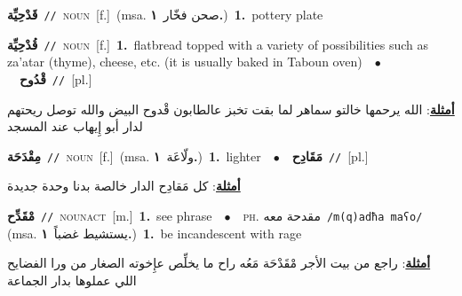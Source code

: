 \documentclass[10pt,a4paper,twoside]{article} %
\begin{document}
\begin{multicols}{2}
{\setlength\topsep{0pt}\textbf{\foreignlanguage{arabic}{قَدْحِيِّة}}\ {\color{gray}\texttt{//}\color{black}}\ \textsc{noun}\ [f.]\ \color{gray}(msa. \foreignlanguage{arabic}{صحن فخّار}~\foreignlanguage{arabic}{\textbf{١.}})\color{black}\ \textbf{1.}~pottery plate\ } \vspace{2mm}

{\setlength\topsep{0pt}\textbf{\foreignlanguage{arabic}{قُدْحِيِّة}}\ {\color{gray}\texttt{//}\color{black}}\ \textsc{noun}\ [f.]\ \textbf{1.}~flatbread topped with a variety of possibilities such as za'atar (thyme), cheese, etc. (it is usually baked in Taboun oven)\ \ $\bullet$\ \ \setlength\topsep{0pt}\textbf{\foreignlanguage{arabic}{قْدُوح}}\ {\color{gray}\texttt{//}\color{black}}\ [pl.]\  \begin{flushright}\color{gray}\foreignlanguage{arabic}{\textbf{\underline{\foreignlanguage{arabic}{أمثلة}}}: الله يرحمها خالتو سماهر لما بقت تخبز عالطابون قْدوح البيض والله توصل ريحتهم لدار أبو إِيهاب عند المسجد}\end{flushright}\color{black}} \vspace{2mm}

{\setlength\topsep{0pt}\textbf{\foreignlanguage{arabic}{مِقْدَحَة}}\ {\color{gray}\texttt{//}\color{black}}\ \textsc{noun}\ [f.]\ \color{gray}(msa. \foreignlanguage{arabic}{ولّاعَة}~\foreignlanguage{arabic}{\textbf{١.}})\color{black}\ \textbf{1.}~lighter\ \ $\bullet$\ \ \setlength\topsep{0pt}\textbf{\foreignlanguage{arabic}{مَقَادِح}}\ {\color{gray}\texttt{//}\color{black}}\ [pl.]\  \begin{flushright}\color{gray}\foreignlanguage{arabic}{\textbf{\underline{\foreignlanguage{arabic}{أمثلة}}}: كل مَقادِح الدار خالصة بدنا وحدة جديدة}\end{flushright}\color{black}} \vspace{2mm}

{\setlength\topsep{0pt}\textbf{\foreignlanguage{arabic}{مْقَدِّح}}\ {\color{gray}\texttt{//}\color{black}}\ \textsc{noun\textunderscore act}\ [m.]\ \textbf{1.}~see phrase\ \ $\bullet$\ \ \textsc{ph.} \color{gray} \foreignlanguage{arabic}{مقدحة معه}\color{black}\ {\color{gray}\texttt{/{\sffamily m(q)adħa maʕo}/}\color{black}}\ \color{gray} (msa. \foreignlanguage{arabic}{يستشيط غضباً}~\foreignlanguage{arabic}{\textbf{١.}})\color{black}\ \textbf{1.}~be incandescent with rage\  \begin{flushright}\color{gray}\foreignlanguage{arabic}{\textbf{\underline{\foreignlanguage{arabic}{أمثلة}}}: راجع من بيت الأجر مْقَدْحَة مَعُه راح ما يخلِّص عإِخوته الصغار من ورا الفضايح اللي عملوها بدار الجماعة}\end{flushright}\color{black}} \vspace{2mm}


\end{multicols}
\end{document}
